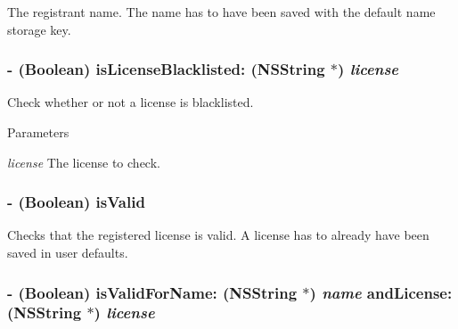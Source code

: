 The registrant name. The name has to have been saved with the default name storage key. \hypertarget{interface_g_d_registration_a4b3b036fb9260a31cc1eca5bb436d27e}{
\subsubsection[{isLicenseBlacklisted:}]{\setlength{\rightskip}{0pt plus 5cm}-\/ (Boolean) isLicenseBlacklisted: ({\bf NSString} $\ast$) {\em license}}}
\label{interface_g_d_registration_a4b3b036fb9260a31cc1eca5bb436d27e}


Check whether or not a license is blacklisted. 
\begin{DoxyParams}{Parameters}
\item[{\em license}]The license to check. \end{DoxyParams}
\hypertarget{interface_g_d_registration_a172ffae07aff61343bf35bd93d50d9f2}{
\subsubsection[{isValid}]{\setlength{\rightskip}{0pt plus 5cm}-\/ (Boolean) isValid }}
\label{interface_g_d_registration_a172ffae07aff61343bf35bd93d50d9f2}


Checks that the registered license is valid. A license has to already have been saved in user defaults. \hypertarget{interface_g_d_registration_aff2e80860b72d462954323dd0203834f}{
\subsubsection[{isValidForName:andLicense:}]{\setlength{\rightskip}{0pt plus 5cm}-\/ (Boolean) isValidForName: ({\bf NSString} $\ast$) {\em name}\/ andLicense: ({\bf NSString} $\ast$) {\em license}}}
\label{interface_g_d_registration_aff2e80860b72d462954323dd0203834f}


